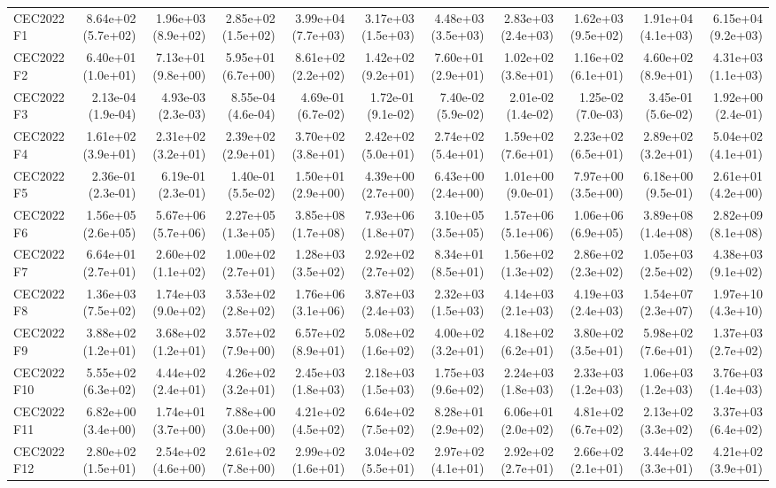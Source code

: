 \begin{longtable}{lrrrrrrrrrr}
CEC2022 F1 & 8.64e+02 (5.7e+02) & 1.96e+03 (8.9e+02) & 2.85e+02 (1.5e+02) & 3.99e+04 (7.7e+03) & 3.17e+03 (1.5e+03) & 4.48e+03 (3.5e+03) & 2.83e+03 (2.4e+03) & 1.62e+03 (9.5e+02) & 1.91e+04 (4.1e+03) & 6.15e+04 (9.2e+03) \\
CEC2022 F2 & 6.40e+01 (1.0e+01) & 7.13e+01 (9.8e+00) & 5.95e+01 (6.7e+00) & 8.61e+02 (2.2e+02) & 1.42e+02 (9.2e+01) & 7.60e+01 (2.9e+01) & 1.02e+02 (3.8e+01) & 1.16e+02 (6.1e+01) & 4.60e+02 (8.9e+01) & 4.31e+03 (1.1e+03) \\
CEC2022 F3 & 2.13e-04 (1.9e-04) & 4.93e-03 (2.3e-03) & 8.55e-04 (4.6e-04) & 4.69e-01 (6.7e-02) & 1.72e-01 (9.1e-02) & 7.40e-02 (5.9e-02) & 2.01e-02 (1.4e-02) & 1.25e-02 (7.0e-03) & 3.45e-01 (5.6e-02) & 1.92e+00 (2.4e-01) \\
CEC2022 F4 & 1.61e+02 (3.9e+01) & 2.31e+02 (3.2e+01) & 2.39e+02 (2.9e+01) & 3.70e+02 (3.8e+01) & 2.42e+02 (5.0e+01) & 2.74e+02 (5.4e+01) & 1.59e+02 (7.6e+01) & 2.23e+02 (6.5e+01) & 2.89e+02 (3.2e+01) & 5.04e+02 (4.1e+01) \\
CEC2022 F5 & 2.36e-01 (2.3e-01) & 6.19e-01 (2.3e-01) & 1.40e-01 (5.5e-02) & 1.50e+01 (2.9e+00) & 4.39e+00 (2.7e+00) & 6.43e+00 (2.4e+00) & 1.01e+00 (9.0e-01) & 7.97e+00 (3.5e+00) & 6.18e+00 (9.5e-01) & 2.61e+01 (4.2e+00) \\
CEC2022 F6 & 1.56e+05 (2.6e+05) & 5.67e+06 (5.7e+06) & 2.27e+05 (1.3e+05) & 3.85e+08 (1.7e+08) & 7.93e+06 (1.8e+07) & 3.10e+05 (3.5e+05) & 1.57e+06 (5.1e+06) & 1.06e+06 (6.9e+05) & 3.89e+08 (1.4e+08) & 2.82e+09 (8.1e+08) \\
CEC2022 F7 & 6.64e+01 (2.7e+01) & 2.60e+02 (1.1e+02) & 1.00e+02 (2.7e+01) & 1.28e+03 (3.5e+02) & 2.92e+02 (2.7e+02) & 8.34e+01 (8.5e+01) & 1.56e+02 (1.3e+02) & 2.86e+02 (2.3e+02) & 1.05e+03 (2.5e+02) & 4.38e+03 (9.1e+02) \\
CEC2022 F8 & 1.36e+03 (7.5e+02) & 1.74e+03 (9.0e+02) & 3.53e+02 (2.8e+02) & 1.76e+06 (3.1e+06) & 3.87e+03 (2.4e+03) & 2.32e+03 (1.5e+03) & 4.14e+03 (2.1e+03) & 4.19e+03 (2.4e+03) & 1.54e+07 (2.3e+07) & 1.97e+10 (4.3e+10) \\
CEC2022 F9 & 3.88e+02 (1.2e+01) & 3.68e+02 (1.2e+01) & 3.57e+02 (7.9e+00) & 6.57e+02 (8.9e+01) & 5.08e+02 (1.6e+02) & 4.00e+02 (3.2e+01) & 4.18e+02 (6.2e+01) & 3.80e+02 (3.5e+01) & 5.98e+02 (7.6e+01) & 1.37e+03 (2.7e+02) \\
CEC2022 F10 & 5.55e+02 (6.3e+02) & 4.44e+02 (2.4e+01) & 4.26e+02 (3.2e+01) & 2.45e+03 (1.8e+03) & 2.18e+03 (1.5e+03) & 1.75e+03 (9.6e+02) & 2.24e+03 (1.8e+03) & 2.33e+03 (1.2e+03) & 1.06e+03 (1.2e+03) & 3.76e+03 (1.4e+03) \\
CEC2022 F11 & 6.82e+00 (3.4e+00) & 1.74e+01 (3.7e+00) & 7.88e+00 (3.0e+00) & 4.21e+02 (4.5e+02) & 6.64e+02 (7.5e+02) & 8.28e+01 (2.9e+02) & 6.06e+01 (2.0e+02) & 4.81e+02 (6.7e+02) & 2.13e+02 (3.3e+02) & 3.37e+03 (6.4e+02) \\
CEC2022 F12 & 2.80e+02 (1.5e+01) & 2.54e+02 (4.6e+00) & 2.61e+02 (7.8e+00) & 2.99e+02 (1.6e+01) & 3.04e+02 (5.5e+01) & 2.97e+02 (4.1e+01) & 2.92e+02 (2.7e+01) & 2.66e+02 (2.1e+01) & 3.44e+02 (3.3e+01) & 4.21e+02 (3.9e+01) \\
\bottomrule
\end{longtable}

